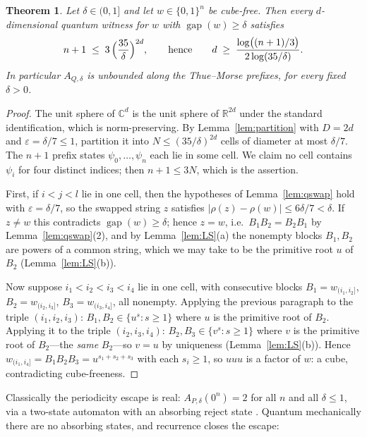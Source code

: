 \documentclass[11pt]{amsart}
\newtheorem{theorem}{Theorem}[section]
\theoremstyle{definition}
\theoremstyle{remark}
\newcommand{\R}{\mathbb{R}}
\newcommand{\C}{\mathbb{C}}
\newcommand{\gapp}{\operatorname{gap}}
\begin{document}
\begin{theorem}\label{thm:cubefree}
Let $\delta\in(0,1]$ and let $w\in\{0,1\}^n$ be cube-free. Then every
$d$-dimensional quantum witness for $w$ with $\gapp(w)\ge\delta$
satisfies
\[
  n+1\;\le\;3\,\Bigl(\frac{35}{\delta}\Bigr)^{2d},
  \qquad\text{hence}\qquad
  d\;\ge\;\frac{\log\bigl((n+1)/3\bigr)}{2\log(35/\delta)} .
\]
In particular $A_{Q,\delta}$ is unbounded along the Thue--Morse
prefixes, for every fixed $\delta>0$.
\end{theorem}

\begin{proof}
The unit sphere of $\C^d$ is the unit sphere of $\R^{2d}$ under the
standard identification, which is norm-preserving. By
Lemma~\ref{lem:partition} with $D=2d$ and $\varepsilon=\delta/7\le1$,
partition it into $N\le(35/\delta)^{2d}$ cells of diameter at most
$\delta/7$. The $n+1$ prefix states $\psi_0,\dots,\psi_n$ each lie in
some cell. We claim no cell contains $\psi_{i}$ for four distinct
indices; then $n+1\le3N$, which is the assertion.

First, if $i<j<l$ lie in one cell, then the hypotheses of
Lemma~\ref{lem:qswap} hold with $\varepsilon=\delta/7$, so the swapped
string $z$ satisfies $|\rho(z)-\rho(w)|\le6\delta/7<\delta$. If
$z\ne w$ this contradicts $\gapp(w)\ge\delta$; hence $z=w$, i.e.\
$B_1B_2=B_2B_1$ by Lemma~\ref{lem:qswap}(2), and by
Lemma~\ref{lem:LS}(a) the nonempty blocks $B_1,B_2$ are powers of a
common string, which we may take to be the primitive root $u$ of
$B_2$ (Lemma~\ref{lem:LS}(b)).

Now suppose $i_1<i_2<i_3<i_4$ lie in one cell, with consecutive
blocks $B_1=w_{(i_1,i_2]}$, $B_2=w_{(i_2,i_3]}$,
$B_3=w_{(i_3,i_4]}$, all nonempty. Applying the previous paragraph to
the triple $(i_1,i_2,i_3)$: $B_1,B_2\in\{u^s:s\ge1\}$ where $u$ is
the primitive root of $B_2$. Applying it to the triple
$(i_2,i_3,i_4)$: $B_2,B_3\in\{v^s:s\ge1\}$ where $v$ is the primitive
root of $B_2$---the \emph{same} $B_2$---so $v=u$ by uniqueness
(Lemma~\ref{lem:LS}(b)). Hence
$w_{(i_1,i_4]}=B_1B_2B_3=u^{s_1+s_2+s_3}$ with each $s_i\ge1$, so
$uuu$ is a factor of $w$: a cube, contradicting cube-freeness.
\end{proof}

Classically the periodicity escape is real: $A_{P,\delta}(0^n)=2$ for
all $n$ and all $\delta\le1$, via a two-state automaton with an
absorbing reject state \cite{KHpfa}. Quantum mechanically there are no
absorbing states, and recurrence closes the escape:
\end{document}
